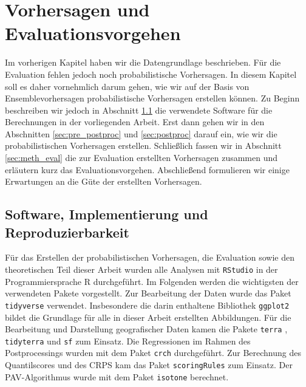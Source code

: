 \chapter{Vorhersagen und Evaluationsvorgehen} \label{chap:meth}
Im vorherigen Kapitel haben wir die Datengrundlage beschrieben. Für die Evaluation fehlen jedoch noch probabilistische Vorhersagen. In diesem Kapitel soll es daher vornehmlich darum gehen, wie wir auf der Basis von Ensemblevorhersagen probabilistische Vorhersagen erstellen können. Zu Beginn beschreiben wir jedoch in Abschnitt \ref{sec:sofware} die verwendete Software für die Berechnungen in der vorliegenden Arbeit. Erst dann gehen wir in den Abschnitten \ref{sec:pre_postproc} und \ref{sec:postproc} darauf ein, wie wir die probabilistischen Vorhersagen erstellen. Schließlich fassen wir in Abschnitt \ref{sec:meth_eval} die zur Evaluation erstellten Vorhersagen zusammen und erläutern kurz das Evaluationsvorgehen. Abschließend formulieren wir einige Erwartungen an die Güte der erstellten Vorhersagen.

\section{Software, Implementierung und Reproduzierbarkeit} \label{sec:sofware}
Für das Erstellen der probabilistischen Vorhersagen, die Evaluation sowie den theoretischen Teil dieser Arbeit wurden alle Analysen mit \texttt{RStudio} \parencite{Rstudio} in der Programmiersprache R \parencite{R} durchgeführt. Im Folgenden werden die wichtigsten der verwendeten Pakete vorgestellt. Zur Bearbeitung der Daten wurde das Paket \texttt{tidyverse} \parencite{tidy} verwendet. Insbesondere die darin enthaltene Bibliothek \texttt{ggplot2} \parencite{ggplot2} bildet die Grundlage für alle in dieser Arbeit erstellten Abbildungen. Für die Bearbeitung und Darstellung geografischer Daten kamen die Pakete \texttt{terra} \parencite{terra}, \texttt{tidyterra} \parencite{tidyterra} und \texttt{sf} \parencite{sf} zum Einsatz. Die Regressionen im Rahmen des Postprocessings wurden mit dem Paket \texttt{crch} \parencite{crch} durchgeführt. Zur Berechnung des Quantilscores und des CRPS kam das Paket \texttt{scoringRules} \parencite{scoringRules} zum Einsatz. Der PAV-Algorithmus wurde mit dem Paket \texttt{isotone} \parencite{isotone} berechnet. 


